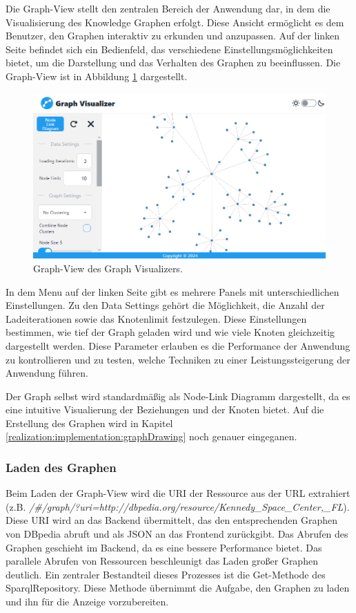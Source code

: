 Die Graph-View stellt den zentralen Bereich der Anwendung dar, in dem die Visualisierung des Knowledge Graphen erfolgt. Diese Ansicht ermöglicht es dem Benutzer, den Graphen interaktiv zu erkunden und anzupassen. Auf der linken Seite befindet sich ein Bedienfeld, das verschiedene Einstellungsmöglichkeiten bietet, um die Darstellung und das Verhalten des Graphen zu beeinflussen. Die Graph-View ist in Abbildung \ref{fig:realization:implementation:graphview} dargestellt.

\begin{figure}[h]
    \centering
    \includegraphics[height=.5\textwidth]{images/03/GraphView.png}
    \caption{Graph-View des Graph Visualizers.}
    \label{fig:realization:implementation:graphview}
\end{figure}

In dem Menu auf der linken Seite gibt es mehrere Panels mit unterschiedlichen Einstellungen. Zu den Data Settings gehört die Möglichkeit, die Anzahl der Ladeiterationen sowie das Knotenlimit festzulegen. Diese Einstellungen bestimmen, wie tief der Graph geladen wird und wie viele Knoten gleichzeitig dargestellt werden. Diese Parameter erlauben es die Performance der Anwendung zu kontrollieren und zu testen, welche Techniken zu einer Leistungssteigerung der Anwendung führen.

Der Graph selbst wird standardmäßig als Node-Link Diagramm dargestellt, da es eine intuitive Visualierung der Beziehungen und der Knoten bietet. Auf die Erstellung des Graphen wird in Kapitel \ref{realization:implementation:graphDrawing} noch genauer eingeganen.

\subsubsection{Laden des Graphen}

Beim Laden der Graph-View wird die URI der Ressource aus der URL extrahiert (z.B. \textit{/\#/graph/?uri=http://dbpedia.org/resource/Kennedy\_Space\_Center,\_FL}). Diese URI wird an das Backend übermittelt, das den entsprechenden Graphen von DBpedia abruft und als JSON an das Frontend zurückgibt. Das Abrufen des Graphen geschieht im Backend, da es eine bessere Performance bietet. Das parallele Abrufen von Ressourcen beschleunigt das Laden großer Graphen deutlich. Ein zentraler Bestandteil dieses Prozesses ist die Get-Methode des SparqlRepository. Diese Methode übernimmt die Aufgabe, den Graphen zu laden und ihn für die Anzeige vorzubereiten.


